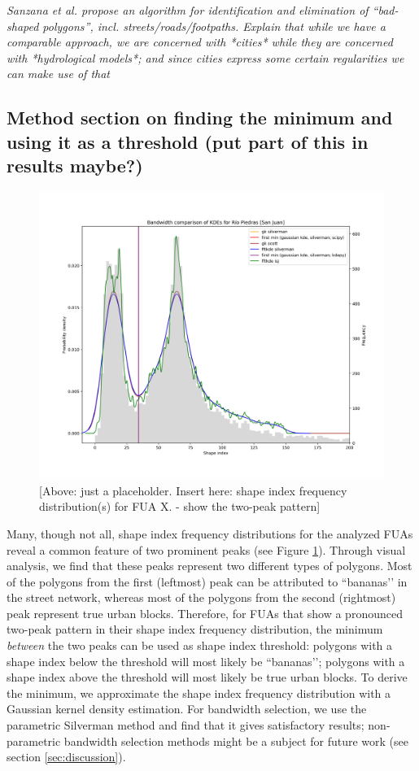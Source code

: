 \textit{Sanzana et al. propose an algorithm for identification and elimination of ``bad-shaped polygons'', incl. streets/roads/footpaths. Explain that while we have a comparable approach, we are concerned with *cities* while they are concerned with *hydrological models*; and since cities express some certain regularities we can make use of that}

\subsection*{Method section on finding the minimum and using it as a threshold (put part of this in results maybe?)}

\begin{figure}
    \centering
    \includegraphics[width=0.5\linewidth]{figures/308}
    \caption{[Above: just a placeholder. Insert here: shape index frequency distribution(s) for FUA X. - show the two-peak pattern]}
    \label{fig:si-dist}
\end{figure}

Many, though not all, shape index frequency distributions for the analyzed FUAs reveal a common feature of two prominent peaks (see Figure \ref{fig:si-dist}). Through visual analysis, we find that these peaks represent two different types of polygons. Most of the polygons from the first (leftmost) peak can be attributed to ``bananas’’ in the street network, whereas most of the polygons from the second (rightmost) peak represent true urban blocks. Therefore, for FUAs that show a pronounced two-peak pattern in their shape index frequency distribution, the minimum \textit{between} the two peaks can be used as shape index threshold: polygons with a shape index below the threshold will most likely be ``bananas’’; polygons with a shape index above the threshold will most likely be true urban blocks. To derive the minimum, we approximate the shape index frequency distribution with a Gaussian kernel density estimation. For bandwidth selection, we use the parametric Silverman method \cite{silverman_using_1981} and find that it gives satisfactory results; non-parametric bandwidth selection methods might be a subject for future work (see section \ref{sec:discussion}). 

